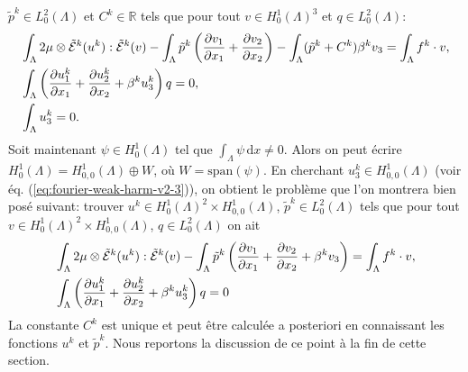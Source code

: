 $\tilde p^k \in L^2_0(\Lambda)$ et $C^k\in\mathbb R$ tels que pour
tout $v\in H^1_0(\Lambda)^3$ et $q \in L^2_0(\Lambda)$:
\begin{align}
  &\int_\Lambda 2\mu\otimes\tilde{\mathcal E}^k(u^k):\tilde{\mathcal E}^k(v)
  - \int_\Lambda \tilde p^k\left( \frac{\partial v_1}{\partial x_1} +
    \frac{\partial v_2}{\partial x_2} \right) - \int_\Lambda(\tilde p^k +
  C^k)\beta^k v_3
  = \int_\Lambda f^k\cdot v,\label{eq:fourier-weak-harm-v2-1}\\
  &\int_\Lambda \left( \frac{\partial u_1^k}{\partial x_1} +
    \frac{\partial u_2^k}{\partial x_2} + \beta^k u_3^k \right)q =
  0,\label{eq:fourier-weak-harm-v2-2}\\
  &\int_\Lambda u_3^k = 0.\label{eq:fourier-weak-harm-v2-3}
\end{align}
Soit maintenant $\psi \in H^1_0(\Lambda)$ tel que $\int_\Lambda
\psi\,\mathrm dx \neq 0$. Alors on peut écrire $H^1_0(\Lambda) =
H^1_{0,0}(\Lambda) \oplus W$, où $W =\mathrm{span}(\psi)$. En
cherchant $u_3^k \in H^1_{0,0}(\Lambda)$ (voir éq. (\ref{eq:fourier-weak-harm-v2-3})), on obtient
le problème que l'on montrera bien posé suivant: trouver $u^k \in
H_0^1(\Lambda)^2 \times H_{0,0}^1(\Lambda)$, $\tilde p^k \in
L^2_0(\Lambda)$ tels que pour tout $v \in H_0^1(\Lambda)^2 \times
H_{0,0}^1(\Lambda)$, $q \in L^2_0(\Lambda)$ on ait
\begin{align}
  &\int_\Lambda 2\mu\otimes\tilde{\mathcal E}^k(u^k):\tilde{\mathcal E}^k(v)
  - \int_\Lambda \tilde p^k\left( \frac{\partial v_1}{\partial x_1} +
    \frac{\partial v_2}{\partial x_2} + \beta^k v_3 \right)
  = \int_\Lambda f^k\cdot v,\label{eq:fourier-weak-harm-v3-1}\\
  &\int_\Lambda \left( \frac{\partial u_1^k}{\partial x_1} + \frac{\partial u_2^k}{\partial x_2} + \beta^k u_3^k \right)q = 0\label{eq:fourier-weak-harm-v3-2}
\end{align}
La constante $C^k$ est unique et peut être calculée a posteriori en
connaissant les fonctions $u^k$ et $\tilde p^k$. Nous reportons la
discussion de ce point à la fin de cette section.

